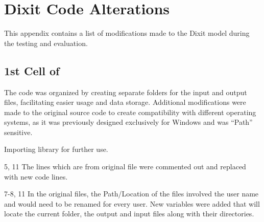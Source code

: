 \chapter{Dixit Code Alterations}
\label{ch:appendixexxonmobil}
This appendix contains a list of modifications made to the Dixit model during the testing and evaluation.

\section{1st Cell of }

The code was organized by creating separate folders for the input and output files, facilitating easier usage and data storage. Additional modifications were made to the original source code to create compatibility with different operating systems, as it was previously designed exclusively for Windows and was ``Path'' sensitive.

\begin{codemodifications}

\begin{codemodification}{1}
Importing  library for further use.
\end{codemodification}

\begin{codemodification}{5, 11}
The lines which are from original file were commented out and replaced with new code lines.
\end{codemodification}

\begin{codemodification}{7-8, 11}
In the original files, the Path/Location of the files involved the user name and would need to be renamed for every user.  New variables were added that will locate the current folder, the output and input files along with their directories.
\end{codemodification}

\end{codemodifications}

